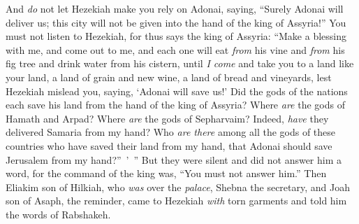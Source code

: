 \begin{biblechapter}
\verse And \textit{do} not let Hezekiah make you rely on Adonai, saying, “Surely Adonai will deliver us; this city will not be given into the hand of the king of Assyria!”
\verse You must not listen to Hezekiah, for thus says the king of Assyria: “Make a blessing with me, and come out to me, and each one will eat \textit{from} his vine and \textit{from} his fig tree and drink water from his cistern,
\verse until \textit{I come} and take you to a land like your land, a land of grain and new wine, a land of bread and vineyards,
\verse lest Hezekiah mislead you, saying, ‘Adonai will save us!’ Did the gods of the nations each save his land from the hand of the king of Assyria?
\verse Where \textit{are} the gods of Hamath and Arpad? Where \textit{are} the gods of Sepharvaim? Indeed, \textit{have} they delivered Samaria from my hand?
\verse Who \textit{are there} among all the gods of these countries who have saved their land from my hand, that Adonai should save Jerusalem from my hand?” ’ ”
\verse But they were silent and did not answer him a word, for the command of the king was, “You must not answer him.”
\verse Then Eliakim son of Hilkiah, who \textit{was} over the \textit{palace}, Shebna the secretary, and Joah son of Asaph, the reminder, came to Hezekiah \textit{with} torn garments and told him the words of Rabshakeh.
\end{biblechapter}

